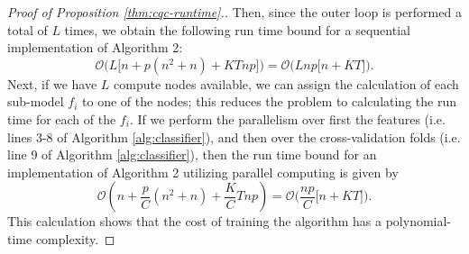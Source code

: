\begin{proof}[Proof of Proposition \ref{thm:cqc-runtime}.]
  Then, since the outer loop is performed a total of $L$ times, we obtain the
  following run time bound for a sequential implementation of Algorithm 2:
  \begin{equation}
    \label{eq:classifier-runtime}
    \mathcal{O}\Big( L \Big[ n + p(n^2 + n) + KTnp \Big] \Big)
    = \mathcal{O}\Big( Lnp \big[ n + KT \big] \Big).
  \end{equation}
  Next, if we have $L$ compute nodes available, we can assign the calculation of
  each sub-model $f_i$ to one of the nodes; this reduces the problem to
  calculating the run time for each of the $f_i$.  If we perform the parallelism
  over first the features (i.e. lines 3-8 of Algorithm \ref{alg:classifier}),
  and then over the cross-validation folds (i.e. line 9 of Algorithm
  \ref{alg:classifier}), then the run time bound for an implementation of
  Algorithm 2 utilizing parallel computing is given by
  \begin{equation}
    \label{eq:classifier-runtime-parallel}
    \mathcal{O}\left( n + \frac{p}{C} (n^2 + n) + \frac{K}{C} Tnp \right) 
    = \mathcal{O}\Big( \frac{np}{C} \big[ n + KT \big] \Big).
  \end{equation}
  This calculation shows that the cost of training the algorithm has a
  polynomial-time complexity.
\end{proof}



